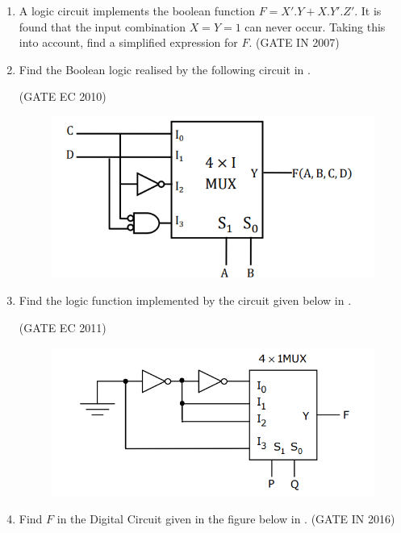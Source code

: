 \begin{enumerate}[label=\arabic*.,ref=\theenumi]
\begin{figure}[H]
\caption{}
\label{fig:2007-gate-ec-43}
\end{figure}
\item 
\label{prob:2007-gate-in-10}
      A logic circuit implements the boolean function $F=X'.Y+X.Y'.Z'$. It is found that the input combination $X=Y=1$ can never occur. Taking this into account, find a simplified expression for $F$. 
\hfill (GATE IN 2007)
\item 
\label{prob:2010-gate-ec-39}
Find the Boolean logic realised by the following circuit in 
.

\hfill (GATE EC 2010)
\begin{figure}[H]
\centering
	\includegraphics[width=0.5\columnwidth]{figs/2010-gate-ec-39.png}
\caption{}
\label{fig:2010-gate-ec-39}
\end{figure}
\item 
\label{prob:2011-gate-ec-20}
Find the logic function implemented by the circuit given below 
in 
.

\hfill (GATE EC 2011)
\begin{figure}[H]
\centering
	\includegraphics[width=0.75\columnwidth]{figs/2011-gate-ec-20.png}
\caption{}
\label{fig:2011-gate-ec-20}
\end{figure}
\item
\label{prob:2016/gate/in/19}
Find $F$ in the Digital Circuit given in the figure below
in .
\hfill (GATE IN 2016)
\begin{figure}[H]
	\centering
	\caption{}
\label{fig:2016/gate/in/19}
\end{figure}



\end{enumerate}
